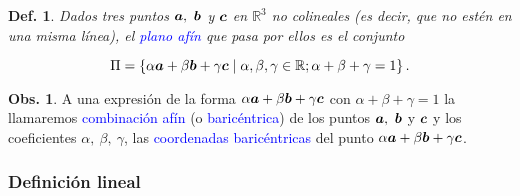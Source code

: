 \documentclass{article}
\theoremstyle{definicion}
\newtheorem{definicion}{Def.}
\theoremstyle{definition}             %
\theoremstyle{definition}             %
\theoremstyle{definition}
\theoremstyle{definition}
\theoremstyle{observacion}
\newtheorem{obs}{Obs.}
\theoremstyle{definition}
\theoremstyle{plain}
\theoremstyle{definition}
\theoremstyle{afirmacion}
\theoremstyle{notation}
\theoremstyle{definition}
\begin{document}
    




    \begin{definicion}
        Dados tres puntos \(\vb*{a},\ \vb*{b}\) y \(\vb*{c}\) en \(\mathbb{R}^{3}\) no colineales (es decir, que no estén en una misma línea), el \textcolor{blue}{plano afín} que pasa por ellos es el conjunto

        \begin{equation*}
            \Pi = \left\lbrace \alpha\vb*{a} + \beta\vb*{b} + \gamma\vb*{c} \mid \alpha, \beta, \gamma \in \mathbb{R}; \alpha + \beta + \gamma = 1\right\rbrace.
        \end{equation*}
    \end{definicion}

    \begin{obs}
        A una expresión de la forma \(\alpha\vb*{a} + \beta\vb*{b} + \gamma\vb*{c}\) con \(\alpha + \beta + \gamma = 1\) la llamaremos \textcolor{blue}{combinación afín} (o \textcolor{blue}{baricéntrica}) de los puntos \(\vb*{a},\ \vb*{b}\) y \(\vb*{c}\) y los coeficientes \(\alpha,\ \beta,\ \gamma\), las \textcolor{blue}{coordenadas baricéntricas} del punto \(\alpha\vb*{a} + \beta\vb*{b} + \gamma\vb*{c}\). 
    \end{obs}

    \subsubsection*{Definición lineal}
\end{document}
